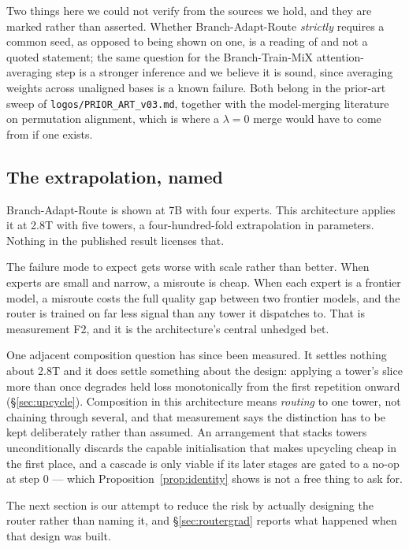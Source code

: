\documentclass[11pt]{article}
\begin{document}
Two things here we could not verify from the sources we hold, and they are marked rather than asserted. Whether Branch-Adapt-Route \emph{strictly} requires a common seed, as opposed to being shown on one, is a reading of \cite{morrison2026bar} and not a quoted statement; the same question for the Branch-Train-MiX attention-averaging step is a stronger inference and we believe it is sound, since averaging weights across unaligned bases is a known failure. Both belong in the prior-art sweep of \texttt{logos/PRIOR\_ART\_v03.md}, together with the model-merging literature on permutation alignment, which is where a $\lambda = 0$ merge would have to come from if one exists.

\subsection{The extrapolation, named}
\label{sec:extrapolation}

Branch-Adapt-Route is shown at 7B with four experts. This architecture applies it at 2.8T with five towers, a four-hundred-fold extrapolation in parameters. Nothing in the published result licenses that.

The failure mode to expect gets worse with scale rather than better. When experts are small and narrow, a misroute is cheap. When each expert is a frontier model, a misroute costs the full quality gap between two frontier models, and the router is trained on far less signal than any tower it dispatches to. That is measurement F2, and it is the architecture's central unhedged bet.

One adjacent composition question has since been measured. It settles nothing about 2.8T and it does settle something about the design: applying a tower's slice more than once degrades held loss monotonically from the first repetition onward (\S\ref{sec:upcycle}). Composition in this architecture means \emph{routing} to one tower, not chaining through several, and that measurement says the distinction has to be kept deliberately rather than assumed. An arrangement that stacks towers unconditionally discards the capable initialisation that makes upcycling cheap in the first place, and a cascade is only viable if its later stages are gated to a no-op at step 0 --- which Proposition~\ref{prop:identity} shows is not a free thing to ask for.

The next section is our attempt to reduce the risk by actually designing the router rather than naming it, and \S\ref{sec:routergrad} reports what happened when that design was built.
\end{document}
